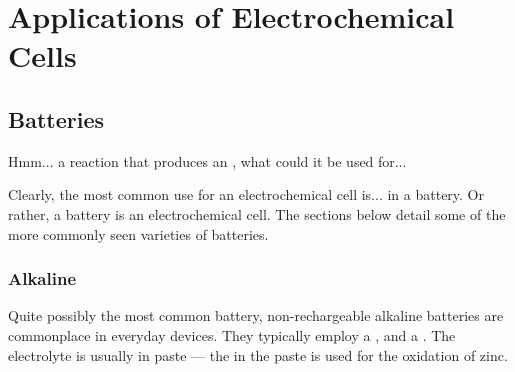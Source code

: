 











	\pagebreak
	\section{Applications of Electrochemical Cells}

		\subsection{Batteries}

			Hmm... a reaction that produces an \emf{}, what could it be used for...

			Clearly, the most common use for an electrochemical cell is... in a battery. Or rather, a battery is an electrochemical cell. The
			sections below detail some of the more commonly seen varieties of batteries.


			\subsubsection{Alkaline}

				Quite possibly the most common battery, non-rechargeable alkaline batteries are commonplace in everyday devices. They
				typically employ a , and a . The electrolyte is usually  in 
				paste --- the  in the paste is used for the oxidation of zinc.


